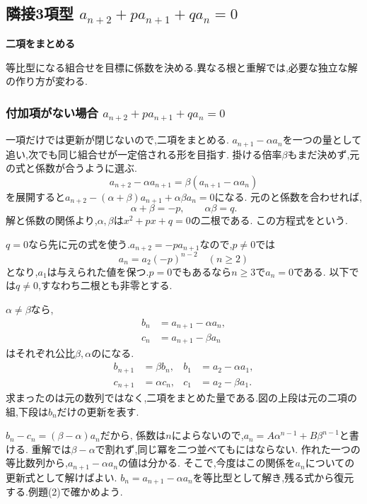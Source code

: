 
\subsection{\texorpdfstring{隣接3項型  $\displaystyle a_{n+2}+pa_{n+1}+qa_n=0$}{隣接3項型}}\label{節：隣接3項型}
\begin{bookpoint}
  \textbf{二項をまとめる}\par
  等比型になる組合せを目標に係数を決める.異なる根と重解では,必要な独立な解の作り方が変わる.
\end{bookpoint}

\subsubsection{\texorpdfstring{付加項がない場合  $\displaystyle a_{n+2}+pa_{n+1}+qa_n=0$}{付加項がない場合}}\label{節：付加項がない場合}
一項だけでは更新が閉じないので,二項をまとめる.
$a_{n+1}-\alpha a_n$を一つの量として追い,次でも同じ組合せが一定倍される形を目指す.
掛ける倍率$\beta$もまだ決めず,元の式と係数が合うように選ぶ.
\[
  a_{n+2}-\alpha a_{n+1}=\beta(a_{n+1}-\alpha a_n)
\]
を展開すると$a_{n+2}-(\alpha+\beta)a_{n+1}+\alpha\beta a_n=0$になる.
元のと係数を合わせれば,
\[
  \alpha+\beta=-p,\qquad\alpha\beta=q.
\]
解と係数の関係より,$\alpha,\beta$は$x^2+px+q=0$の二根である.
この方程式をという.

$q=0$なら先に元の式を使う.$a_{n+2}=-pa_{n+1}$なので,$p\ne0$では
\[
  a_n=a_2(-p)^{n-2}\quad(n\ge2)
\]
となり,$a_1$は与えられた値を保つ.$p=0$でもあるなら$n\ge3$で$a_n=0$である.
以下では$q\ne0$,すなわち二根とも非零とする.

$\alpha\ne\beta$なら,
\[
  \begin{aligned}
    b_n&=a_{n+1}-\alpha a_n,\\
    c_n&=a_{n+1}-\beta a_n
  \end{aligned}
\]
はそれぞれ公比$\beta,\alpha$のになる.
\begin{align*}
  b_{n+1}&=\beta b_n,& b_1&=a_2-\alpha a_1,\\
  c_{n+1}&=\alpha c_n,& c_1&=a_2-\beta a_1.
\end{align*}
求まったのは元の数列ではなく,二項をまとめた量である.図の上段は元の二項の組,下段は$b_n$だけの更新を表す.
\BookFigThreeTerm

$b_n-c_n=(\beta-\alpha)a_n$だから,
\BookMathLayout{\[
    a_n=\frac{(a_2-\alpha a_1)\beta^{n-1}-(a_2-\beta a_1)\alpha^{n-1}}{\beta-\alpha}.
  \]}{\[
    \begin{aligned}
      a_n&=\frac{a_2-\alpha a_1}{\beta-\alpha}\beta^{n-1}\\
      &\quad-\frac{a_2-\beta a_1}{\beta-\alpha}\alpha^{n-1}.
    \end{aligned}
  \]}
係数は$n$によらないので,$a_n=A\alpha^{n-1}+B\beta^{n-1}$と書ける.
重解では$\beta-\alpha$で割れず,同じ冪を二つ並べてもにはならない.
作れた一つの等比数列から,$a_{n+1}-\alpha a_n$の値は分かる.
そこで,今度はこの関係を$a_n$についての更新式として解けばよい.
$b_n=a_{n+1}-\alpha a_n$を等比型として解き,残る式から復元する.例題(2)で確かめよう.

